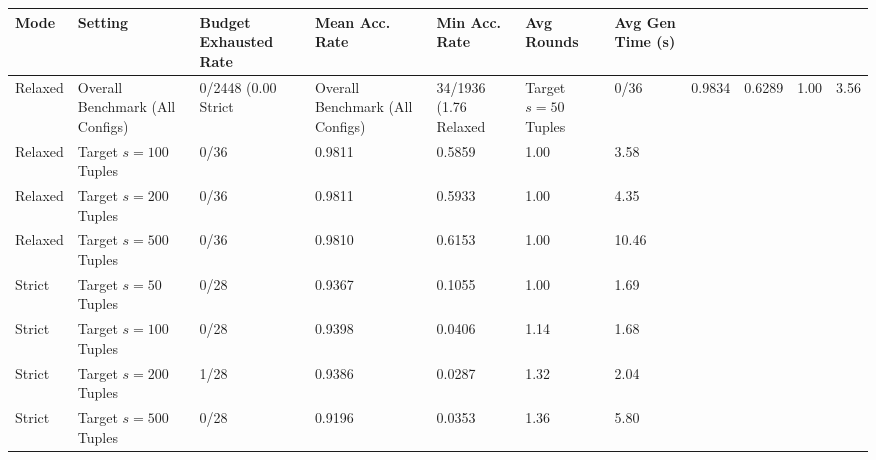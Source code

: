 \begin{tabular}{lllllll}
\toprule
Mode & Setting & Budget Exhausted Rate & Mean Acc. Rate & Min Acc. Rate & Avg Rounds & Avg Gen Time (s) \\
\midrule
Relaxed & Overall Benchmark (All Configs) & 0/2448 (0.00%
Strict & Overall Benchmark (All Configs) & 34/1936 (1.76%
Relaxed & Target $s=50$ Tuples & 0/36 & 0.9834 & 0.6289 & 1.00 & 3.56 \\
Relaxed & Target $s=100$ Tuples & 0/36 & 0.9811 & 0.5859 & 1.00 & 3.58 \\
Relaxed & Target $s=200$ Tuples & 0/36 & 0.9811 & 0.5933 & 1.00 & 4.35 \\
Relaxed & Target $s=500$ Tuples & 0/36 & 0.9810 & 0.6153 & 1.00 & 10.46 \\
Strict & Target $s=50$ Tuples & 0/28 & 0.9367 & 0.1055 & 1.00 & 1.69 \\
Strict & Target $s=100$ Tuples & 0/28 & 0.9398 & 0.0406 & 1.14 & 1.68 \\
Strict & Target $s=200$ Tuples & 1/28 & 0.9386 & 0.0287 & 1.32 & 2.04 \\
Strict & Target $s=500$ Tuples & 0/28 & 0.9196 & 0.0353 & 1.36 & 5.80 \\
\bottomrule
\end{tabular}
